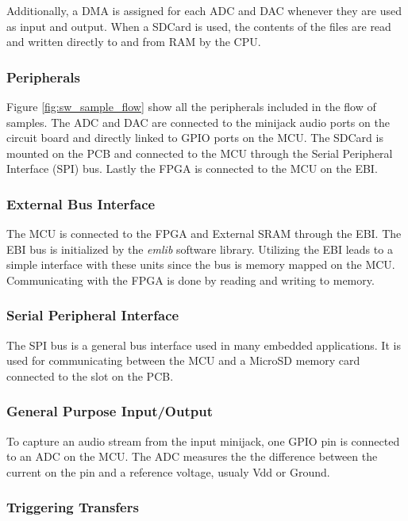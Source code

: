 
Additionally, a DMA is assigned for each ADC and DAC whenever they are used as
input and output. When a SDCard is used, the contents of the files are read and
written directly to and from RAM by the CPU.

\subsubsection{Peripherals}



Figure \ref{fig:sw_sample_flow} show all the peripherals included in the flow of samples.
The ADC and DAC are connected to the minijack audio ports on the circuit board and directly
linked to GPIO ports on the MCU. The SDCard
is mounted on the PCB and connected to the MCU through the Serial Peripheral Interface (SPI)
bus. Lastly the FPGA is connected to the MCU on the EBI.

\subsubsection{External Bus Interface}
The MCU is connected to the FPGA and External SRAM through the EBI. The EBI bus
is initialized by the {\it emlib} software library. Utilizing
the EBI leads to a simple interface with these units since the bus is memory
mapped on the MCU. Communicating with the FPGA is done by reading and writing to memory.

\subsubsection{Serial Peripheral Interface}
The SPI bus is a general bus interface used in many embedded applications. It is used
for communicating between the MCU and a MicroSD memory card connected to the slot
on the PCB.

\subsubsection{General Purpose Input/Output}
To capture an audio stream from the input minijack, one GPIO pin is connected to an
ADC on the MCU. The ADC measures the the difference between the current on the pin 
and a reference voltage, usualy Vdd or Ground. 


\subsubsection{Triggering Transfers}

